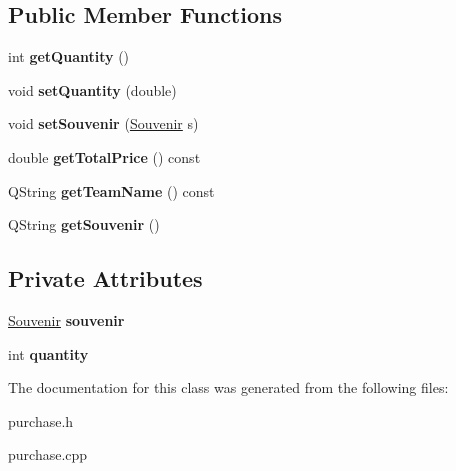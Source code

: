 \subsection*{Public Member Functions}
\begin{DoxyCompactItemize}
\item 
\mbox{\label{class_purchase_affdd7456d399278a348ae2e26f8928dd}} 
int {\bfseries get\+Quantity} ()
\item 
\mbox{\label{class_purchase_ad5dc255665b0986b11da43ad6ce06b3c}} 
void {\bfseries set\+Quantity} (double)
\item 
\mbox{\label{class_purchase_a26156457fb62097acd3341d7f8e2d14d}} 
void {\bfseries set\+Souvenir} (\hyperlink{class_souvenir}{Souvenir} s)
\item 
\mbox{\label{class_purchase_a49adb5a9c4c972faef2bb0dfbfd9327c}} 
double {\bfseries get\+Total\+Price} () const
\item 
\mbox{\label{class_purchase_aae64c12f19f832c742ae036ab0785d89}} 
Q\+String {\bfseries get\+Team\+Name} () const
\item 
\mbox{\label{class_purchase_a49f7cf68192e2bb37faa394cde681ee9}} 
Q\+String {\bfseries get\+Souvenir} ()
\end{DoxyCompactItemize}
\subsection*{Private Attributes}
\begin{DoxyCompactItemize}
\item 
\mbox{\label{class_purchase_ad5c7f4e47489000e1514211b7d219fe7}} 
\hyperlink{class_souvenir}{Souvenir} {\bfseries souvenir}
\item 
\mbox{\label{class_purchase_a2ba21ff1de4cec6e51acad3d6a92d73a}} 
int {\bfseries quantity}
\end{DoxyCompactItemize}


The documentation for this class was generated from the following files\+:\begin{DoxyCompactItemize}
\item 
purchase.\+h\item 
purchase.\+cpp\end{DoxyCompactItemize}
